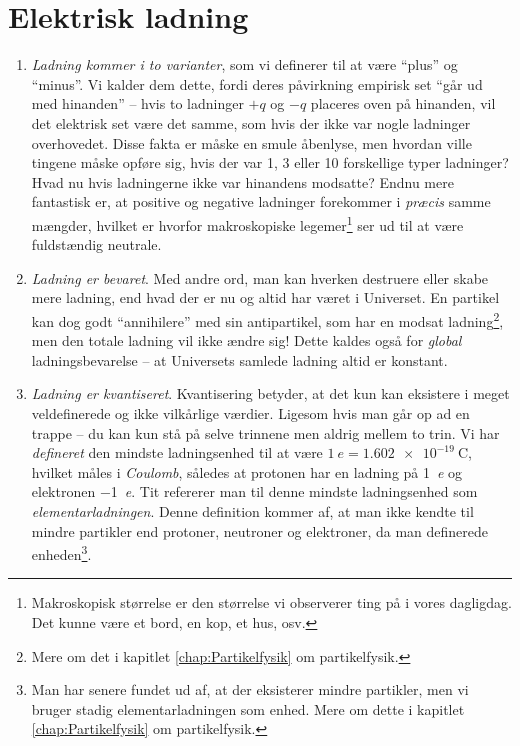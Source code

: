 \section{Elektrisk ladning} \label{sec:ladning}
\begin{enumerate}
    \item \textit{Ladning kommer i to varianter}, som vi definerer til at være ``plus'' og ``minus''. Vi kalder dem dette, fordi deres påvirkning empirisk set ``går ud med hinanden'' -- hvis to ladninger $+q$ og $-q$ placeres oven på hinanden, vil det elektrisk set være det samme, som hvis der ikke var nogle ladninger overhovedet. Disse fakta er måske en smule åbenlyse, men hvordan ville tingene måske opføre sig, hvis der var 1, 3 eller 10 forskellige typer ladninger? Hvad nu hvis ladningerne ikke var hinandens modsatte? Endnu mere fantastisk er, at positive og negative ladninger forekommer i \emph{præcis} samme mængder, hvilket er hvorfor makroskopiske legemer\footnote{Makroskopisk størrelse er den størrelse vi observerer ting på i vores dagligdag. Det kunne være et bord, en kop, et hus, osv.} ser ud til at være fuldstændig neutrale.
    \item \textit{Ladning er bevaret}. Med andre ord, man kan hverken destruere eller skabe mere ladning, end hvad der er nu og altid har været i Universet. En partikel kan dog godt ``annihilere'' med sin antipartikel, som har en modsat ladning\footnote{Mere om det i kapitlet \ref{chap:Partikelfysik} om partikelfysik.}, men den totale ladning vil ikke ændre sig! Dette kaldes også for \emph{global} ladningsbevarelse -- at Universets samlede ladning altid er konstant.
    \item \textit{Ladning er kvantiseret}. Kvantisering betyder, at det kun kan eksistere i meget veldefinerede og ikke vilkårlige værdier. Ligesom hvis man går op ad en trappe -- du kan kun stå på selve trinnene men aldrig mellem to trin. Vi har \emph{defineret} den mindste ladningsenhed til at være $\SI{1}{\elementarycharge} = \SI{1.602e-19}{\coulomb}$, hvilket måles i \emph{Coulomb}, således at protonen har en ladning på \SI{+1}{\elementarycharge} og elektronen \SI{-1}{\elementarycharge}. Tit refererer man til denne mindste ladningsenhed som \emph{elementarladningen}. Denne definition kommer af, at man ikke kendte til mindre partikler end protoner, neutroner og elektroner, da man definerede enheden\footnote{Man har senere fundet ud af, at der eksisterer mindre partikler, men vi bruger stadig elementarladningen som enhed. Mere om dette i kapitlet \ref{chap:Partikelfysik} om partikelfysik.}.
\end{enumerate}

